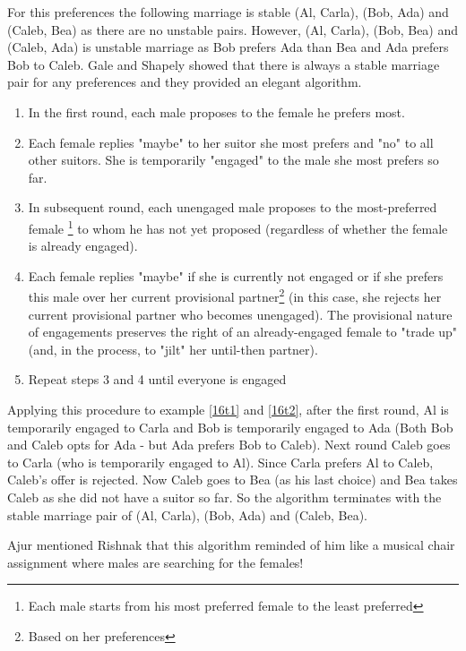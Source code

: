 For this preferences the following marriage is stable (Al, Carla), (Bob, Ada) and (Caleb, Bea) as there are no unstable pairs.
However, (Al, Carla), (Bob, Bea) and (Caleb, Ada) is unstable marriage as Bob prefers Ada than Bea and Ada prefers Bob to Caleb.
Gale and Shapely showed that there is always a stable marriage pair for any preferences and they provided an elegant algorithm.

\begin{enumerate}
    \item In the first round, each male proposes to the female he prefers most.
    \item Each female replies "maybe" to her suitor she most prefers and "no" to all other suitors. She is temporarily "engaged" to the male she most prefers so far. 
    \item In subsequent round, each unengaged male proposes to the most-preferred female \footnote{Each male starts from his most preferred female to the least preferred} to whom he has not yet proposed (regardless of whether the female is already engaged).
    \item Each female replies "maybe" if she is currently not engaged or if she prefers this male over her current provisional partner\footnote{Based on her preferences} (in this case, she rejects her current provisional partner who becomes unengaged). The provisional nature of engagements preserves the right of an already-engaged female to "trade up" (and, in the process, to "jilt" her until-then partner).
   \item Repeat steps 3 and 4 until everyone is engaged
\end{enumerate}

Applying this procedure to example \ref{16t1} and \ref{16t2}, after the first round, Al is temporarily engaged to Carla and Bob is temporarily engaged to Ada (Both Bob and Caleb opts for Ada - but Ada prefers Bob to Caleb). Next round Caleb goes to Carla (who is temporarily engaged to Al). Since Carla prefers Al to Caleb, Caleb's offer is rejected. Now Caleb goes to Bea (as his last choice) and Bea takes Caleb as she did not have a suitor so far. So the algorithm terminates with the stable marriage pair of (Al, Carla), (Bob, Ada) and (Caleb, Bea). 

Ajur mentioned Rishnak that this algorithm reminded of him  like a musical chair assignment where males are searching for the females!

